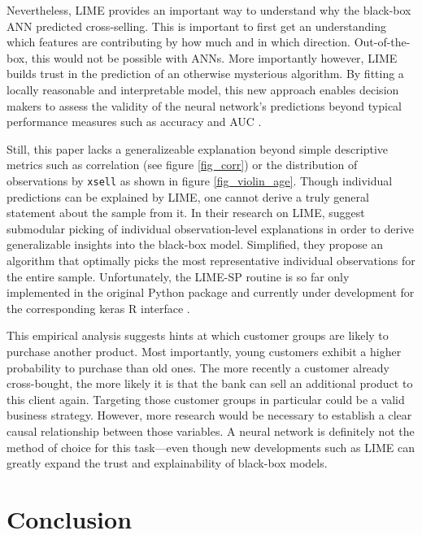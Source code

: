 \documentclass[12pt,a4paper]{article}
\newcommand{\pkg}[1]{{\normalfont\fontseries{b}\selectfont #1}}
\let\proglang=\textsf
\let\code=\texttt
\begin{document}
Nevertheless, LIME  provides an important way to understand why the black-box ANN predicted cross-selling.
This is important to first get an understanding which features are contributing by how much and in which direction.
Out-of-the-box, this would not be possible with ANNs.
More importantly however, LIME builds trust in the prediction of an otherwise mysterious algorithm.
By fitting a locally reasonable and interpretable model, this new approach enables decision makers to assess the validity of the neural network's 
predictions beyond typical performance measures such as accuracy and AUC \citep{ribeiroWhyShouldTrust2016a}.

Still, this paper lacks a generalizeable explanation beyond simple descriptive metrics such as correlation (see figure \ref{fig_corr}) or the distribution of observations by \code{xsell} as shown in figure \ref{fig_violin_age}.
Though individual predictions can be explained by LIME, one cannot derive a truly general statement about the sample from it.
In their research on LIME, \cite{ribeiroWhyShouldTrust2016a} suggest submodular picking of individual observation-level explanations in order to 
derive generalizable insights into the black-box model.
Simplified, they propose an algorithm that optimally picks the most representative individual observations for the entire sample.
Unfortunately, the LIME-SP routine is so far only implemented in the original \proglang{Python} package and currently under development for the corresponding  \pkg{keras} \proglang{R} interface \citep{kavickyLocalInterpretableModelAgnostic2017}. 

This empirical analysis suggests hints at which customer groups are likely to purchase another product.
Most importantly, young customers exhibit a higher probability to purchase than old ones. The more recently a customer already cross-bought,
the more likely it is that the bank can sell an additional product to this client again.
Targeting those customer groups in particular could be a valid business strategy.
However, more research would be necessary to establish a clear causal relationship between those variables.
A neural network is definitely not the method of choice for this task---even though new developments such as LIME can greatly expand the trust and explainability of black-box models.

\section{Conclusion}
\end{document}
